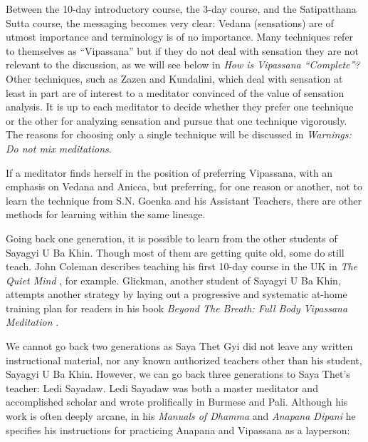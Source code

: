 \documentclass[a4paper, amsfonts, amssymb, amsmath, reprint, showkeys, nofootinbib, twoside]{revtex4-1}
\begin{document}
Between the 10-day introductory course, the 3-day course, and the Satipatthana Sutta
course, the messaging becomes very clear: Vedana  (sensations) are of utmost
importance and terminology is of no importance. Many techniques refer to themselves
as ``Vipassana'' but if they do not deal with sensation they are not relevant to the
discussion, as we will see below in \textit{How is Vipassana ``Complete''?} Other
techniques, such as Zazen and Kundalini, which deal with sensation at least in part
are of interest to a meditator convinced of the value of sensation analysis. It is up
to each meditator to decide whether they prefer one technique or the other for
analyzing sensation and pursue that one technique vigorously. The reasons for
choosing only a single technique will be discussed in \textit{Warnings: Do not mix
  meditations}.

If a meditator finds herself in the position of preferring Vipassana, with an
emphasis on Vedana and Anicca, but preferring, for one reason or another, not to
learn the technique from S.N. Goenka and his Assistant Teachers, there are other
methods for learning within the same lineage.

Going back one generation, it is possible to learn from the other students of Sayagyi
U Ba Khin. Though most of them are getting quite old, some do still teach. John
Coleman describes teaching his first 10-day course in the UK in \textit{The Quiet
  Mind} , for example. Glickman, another student of Sayagyi U Ba Khin,
attempts another strategy by laying out a progressive and systematic at-home training
plan for readers in his book \textit{Beyond The Breath: Full Body Vipassana
  Meditation} .

We cannot go back two generations as Saya Thet Gyi did not leave any written
instructional material, nor any known authorized teachers other than his student,
Sayagyi U Ba Khin. However, we can go back three generations to Saya Thet's teacher:
Ledi Sayadaw. Ledi Sayadaw was both a master meditator and accomplished scholar and
wrote prolifically in Burmese and Pali. Although his work is often deeply arcane, in
his \textit{Manuals of Dhamma} and \textit{Anapana Dipani}  he
specifies his instructions for practicing Anapana and Vipassana as a layperson:
\end{document}
